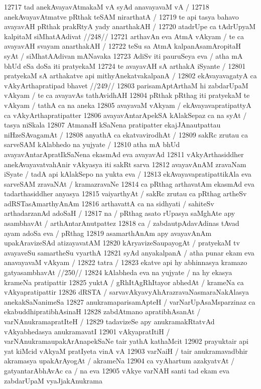 12717 tad anekAvayavAtmakaM vA syAd anavayavaM vA /
12718 	anekAvayavAtmatve pRthak teSAM nirarthatA / 
12719 te api tasya bahavo avayavAH pRthak prakRtyA yady anarthakAH /
12720 	atadrUpe ca tAdrUpyaM kalpitaM siMhatAAdivat //248//
12721 arthavAn eva AtmA vAkyam / te ca avayavAH svayam anarthakAH / 
12722 teSu sa AtmA kalpanAsamAropitaH syAt / siMhatAAdivan mANavaka 
12723 AdiSv iti pauruSeya eva / atha mA bhUd eSa doSa iti pratyekaM 
12724 te avayavAH sA arthakA iSyante /
12801 	pratyekaM sA arthakatve api mithyAnekatvakalpanA / 
12802 	ekAvayavagatyA ca vAkyArthapratipad bhavet //249//  
12803 parisamAptArthaM hi zabdarUpaM vAkyam / te ca avayavAs tathAvidhAH
12804 pRthak pRthag iti pratyekaM te vAkyam / tathA ca na aneka  
12805 avayavaM vAkyam / ekAvayavapratipattyA ca vAkyArthapratipatter
12806 avayavAntarApekSA kAlakSepaz ca na syAt / tasya niSkala 
12807 AtmanaH kSaNena pratipatter ekajJAnautpattau niHzeSAvagamAt /
12808 anyathA ca ekatvavirodhAt /  
12809 	sakRc zrutau ca sarveSAM kAlabhedo na yujyate / 
12810 atha mA bhUd avayavAntarApratIkSaNena ekasmAd eva avayavAd 
12811 vAkyArthasiddher anekAvayavatvahAnir vAkyasya iti sakRt sarva
12812 avayavAnAM zravaNam iSyate / tadA api kAlakSepo na yukta eva / 
12813 ekAvayavapratipattikAla eva sarveSAM zravaNAt / kramazravaNe
12814 ca pRthag arthavatAm ekasmAd eva tadarthasiddher anyasya  
12815 vaiyarthyAt / sakRc zrutau ca pRthag artheSv adRSTasAmarthyAnAm
12816 arthavattA ca na sidhyati / sahiteSv arthadarzanAd adoSaH /
12817 na / pRthag asato rUpasya saMghAte apy asambhavAt / arthAntarAnutpattez
12818 ca / zabdautpAdavAdinas tAvad ayam adoSa eva / pRthag 
12819 asamarthAnAm apy avayavAnAm upakAravizeSAd atizayavatAM  
12820 kAryavizeSaupayogAt / pratyekaM tv avayaveSu samartheSu vyarthA
12821 syAd anyakalpanA / atha punar ekam eva anavayavaM vAkyam /
12822 tatra / 
12823 	ekatve api hy abhinnasya kramazo gatyasambhavAt //250//
12824 kAlabheda eva na yujyate / na hy ekasya krameNa pratipattir 
12825 yuktA / gRhItAgRhItayor abhedAt / krameNa ca vAkyapratipattir  
12826 dRSTA / sarvavAkyavyAhArazravaNasmaraNakAlasya anekakSaNanimeSa
12827 anukramaparisamApteH / varNarUpAsaMsparzinaz ca ekabuddhipratibhAsinaH
12828 zabdAtmano apratibhAsanAt / varNAnukramapratIteH /
12829 tadavizeSe apy anukramakRtatvAd vAkyabhedasya anukramavatI 
12901 vAkyapratItiH / varNAnukramaupakArAnapekSaNe tair yathA kathaMcit
12902 prayuktair api yat kiMcid vAkyaM pratIyeta vinA vA  
12903 varNaiH / tair anukramavadbhir akramasya upakArAyogAt / akrameNa
12904 ca vyAhartum azakyatvAt / gatyantarAbhAvAc ca / na eva 
12905 vAkye varNAH santi tad ekam eva zabdarUpaM vyaJjakAnukrama
